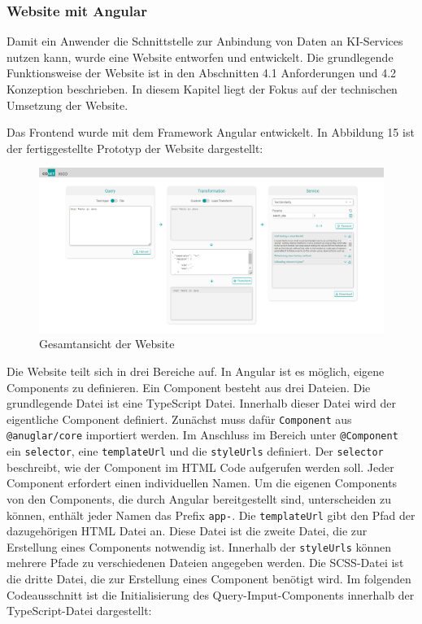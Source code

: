 \subsubsection{Website mit Angular}
Damit ein Anwender die Schnittstelle zur Anbindung von Daten an KI-Services nutzen kann, wurde eine Website entworfen und entwickelt. Die grundlegende Funktionsweise der Website ist in den Abschnitten 4.1 Anforderungen und 4.2 Konzeption beschrieben. In diesem Kapitel liegt der Fokus auf der technischen Umsetzung der Website. 

Das Frontend wurde mit dem Framework Angular entwickelt. In Abbildung 15 ist der fertiggestellte Prototyp der Website dargestellt:

\begin{figure}[H]
  \centering
    \includegraphics[width = 15cm]{bilder/website}
    \caption{Gesamtansicht der Website}
\end{figure}

Die Website teilt sich in drei Bereiche auf. In Angular ist es möglich, eigene Components zu definieren. Ein Component besteht aus drei Dateien. Die grundlegende Datei ist eine TypeScript Datei. Innerhalb dieser Datei wird der eigentliche Component definiert. Zunächst muss dafür \texttt{Component} aus \texttt{@anuglar/core} importiert werden. Im Anschluss im Bereich unter \texttt{@Component} ein \texttt{selector}, eine \texttt{templateUrl} und die \texttt{styleUrls} definiert. Der \texttt{selector} beschreibt, wie der Component im HTML Code aufgerufen werden soll. Jeder Component erfordert einen individuellen Namen. Um die eigenen Components von den Components, die durch Angular bereitgestellt sind, unterscheiden zu können, enthält jeder Namen das Prefix \texttt{app-}. Die \texttt{templateUrl} gibt den Pfad der dazugehörigen HTML Datei an. Diese Datei ist die zweite Datei, die zur Erstellung eines Components notwendig ist. Innerhalb der \texttt{styleUrls} können mehrere Pfade zu verschiedenen Dateien angegeben werden. Die SCSS-Datei ist die dritte Datei, die zur Erstellung eines Component benötigt wird. Im folgenden Codeausschnitt ist die Initialisierung des Query-Imput-Components innerhalb der TypeScript-Datei dargestellt:


